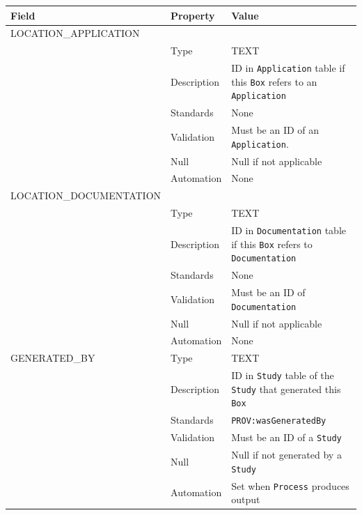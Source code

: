 \documentclass[
]{article}
\newcounter{none}
\begin{document}
{\def\LTcaptype{none} 
\begin{longtable}[]{@{}
  >{\raggedright\arraybackslash}p{}
  >{\raggedright\arraybackslash}p{}
  >{\raggedright\arraybackslash}p{}@{}}
\toprule\noalign{}
\begin{minipage}[b]{\linewidth}\raggedright
Field
\end{minipage} & \begin{minipage}[b]{\linewidth}\raggedright
Property
\end{minipage} & \begin{minipage}[b]{\linewidth}\raggedright
Value
\end{minipage} \\
\midrule\noalign{}
\endhead
\bottomrule\noalign{}
\endlastfoot
LOCATION\_APPLICATION & & \\
& Type & TEXT \\
& Description & ID in \texttt{Application} table if this \texttt{Box}
refers to an \texttt{Application} \\
& Standards & None \\
& Validation & Must be an ID of an \texttt{Application}. \\
& Null & Null if not applicable \\
& Automation & None \\
LOCATION\_DOCUMENTATION & & \\
& Type & TEXT \\
& Description & ID in \texttt{Documentation} table if this \texttt{Box}
refers to \texttt{Documentation} \\
& Standards & None \\
& Validation & Must be an ID of \texttt{Documentation} \\
& Null & Null if not applicable \\
& Automation & None \\
GENERATED\_BY & Type & TEXT \\
& Description & ID in \texttt{Study} table of the \texttt{Study} that
generated this \texttt{Box} \\
& Standards & \texttt{PROV:wasGeneratedBy} \\
& Validation & Must be an ID of a \texttt{Study} \\
& Null & Null if not generated by a \texttt{Study} \\
& Automation & Set when \texttt{Process} produces output \\

\end{longtable}}
\end{document}
